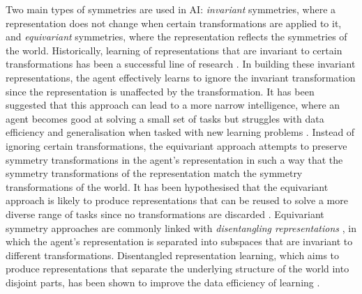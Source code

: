 Two main types of symmetries are used in AI: \textit{invariant} symmetries, where a representation does not change when certain transformations are applied to it, and \textit{equivariant} symmetries, where the representation reflects the symmetries of the world.
Historically, learning of representations that are invariant to certain transformations has been a successful line of research \autocite{Krizhevsky2012, Hu2018, Silver2016, Espeholt2018}.
In building these invariant representations, the agent effectively learns to ignore the invariant transformation since the representation is unaffected by the transformation.
It has been suggested that this approach can lead to a more narrow intelligence, where an agent becomes good at solving a small set of tasks but struggles with data efficiency and generalisation when tasked with new learning problems \autocite{marcus2018deep, Cobbe2019}.
Instead of ignoring certain transformations, the equivariant approach attempts to preserve symmetry transformations in the agent's representation in such a  way that the symmetry transformations of the representation match the symmetry transformations of the world.
It has been hypothesised that the equivariant approach is likely to produce representations that can be reused to solve a more diverse range of tasks since no transformations are discarded \autocite{Higgins2022}.
Equivariant symmetry approaches are commonly linked with \textit{disentangling representations} \autocite{Bengio2013}, in which the agent's representation is separated into subspaces that are invariant to different transformations.
Disentangled representation learning, which aims to produce representations that separate the underlying structure of the world into disjoint parts, has been shown to improve the data efficiency of learning \autocite{raffin2019decoupling,wang2022disentangled}.

